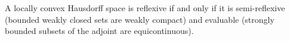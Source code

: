 A locally convex Hausdorff space is reflexive if and only if it is semi-reflexive (bounded weakly closed sets are weakly compact) and evaluable (strongly bounded subsets of the adjoint are equicontinuous).
